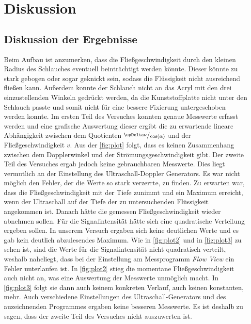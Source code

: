 \section{Diskussion}
\label{sec:Diskussion}

\subsection{Diskussion der Ergebnisse}
\label{subsec:diskErg}
Beim Aufbau ist anzumerken, dass die Fließgeschwindigkeit durch den kleinen Radius des Schlauches eventuell beinträchtigt werden könnte.
Dieser könnte zu stark gebogen oder sogar geknickt sein, sodass die Flüssigkeit nicht ausreichend fließen kann.
Außerdem konnte der Schlauch nicht an das Acryl mit den drei einzustellenden Winkeln gedrückt werden, da die Kunststoffplatte nicht 
unter den Schlauch passte und somit nicht für eine bessere Fixierung untergeschoben werden konnte.\newline
Im ersten Teil des Versuches konnten genaue Messwerte erfasst werden und eine grafische Auswertung dieser ergibt die zu erwartende lineare Abhängigkeit
zwischen dem Quotienten $\sfrac{\upDelta\nu}{\cos(\alpha)}$ und der Fließgeschwindigkeit $v$.
Aus der \autoref{fig:plot} folgt, dass es keinen Zusammenhang zwischen dem Dopplerwinkel und der Strömungsgeschwindigkeit gibt.\newline
Der zweite Teil des Versuches ergab jedoch keine gebrauchbaren Messwerte. Dies liegt vermutlich an der Einstellung des Ultraschall-Doppler Generators.
Es war nicht möglich den Fehler, der die Werte so stark verzerrte, zu finden. Zu erwarten war, dass die Fließgeschwindigkeit mit der Tiefe zunimmt
und ein Maximum erreicht, wenn der Ultraschall auf der Tiefe der zu untersuchenden Flüssigkeit angekommen ist. Danach hätte die gemessen 
Fließgeschwindigkeit wieder abnehmen sollen. Für die Signalintensität hätte sich eine quadratische Verteilung ergeben sollen.\newline
In unserem Versuch ergaben sich keine deutlichen Werte und es gab kein deutlich abzulesendes Maximum. Wie in \autoref{fig:plot2} und in \autoref{fig:plot3} zu sehen ist, sind
die Werte für die Signalintensität nicht quadratisch verteilt, weshalb naheliegt, dass bei der Einstellung am Messprogramm \textit{Flow View} ein Fehler unterlaufen ist.
In \autoref{fig:plot2} stieg die momentane Fließgeschwindigkeit auch nicht an, was eine Auswertung der Messwerte unmöglich macht. In \autoref{fig:plot3} folgt sie dann auch keinem 
konkreten Verlauf, auch keinen konstanten, mehr. Auch verschiedene Einstellungen des Ultraschall-Generators und des auzeichnenden Programmes ergaben keine besseren Messwerte.
Es ist deshalb zu sagen, dass der zweite Teil des Versuches nicht auszuwerten ist.\newline

